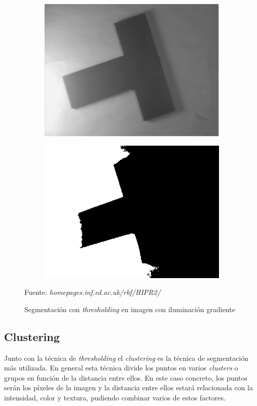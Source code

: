 \begin{figure}[H]
	\centering
	\captionsetup{justification=centering}
	\begin{subfigure}[t]{2.5in}
		\centering
		\includegraphics[width=.7\textwidth]{./imagenes/thresholding5}
		\label{thresholding5}
	\end{subfigure}
	\begin{subfigure}[t]{2.5in}
		\centering
		\includegraphics[width=.7\textwidth]{./imagenes/thresholding6}
		\label{thresholding6}
	\end{subfigure}
	\caption{Segmentaci\'{o}n con \textit{thresholding} en imagen con iluminaci\'{o}n gradiente}
	\vspace{2 mm}			
	Fuente: \textit{homepages.inf.ed.ac.uk/rbf/HIPR2/}
	\label{thresHold3}
\end{figure}


\subsection{Clustering}

Junto con la t\'{e}cnica de \textit{thresholding} el \textit{clustering} es la t\'{e}cnica de segmentaci\'{o}n m\'{a}s utilizada. En general esta t\'{e}cnica divide los puntos en varios \textit{clusters} o grupos en funci\'{o}n de la distancia entre ellos. En este caso concreto, los puntos ser\'{a}n los p\'{i}xeles de la imagen y la distancia entre ellos estar\'{a} relacionada con la intensidad, color y textura, pudiendo combinar varios de estos factores. 

